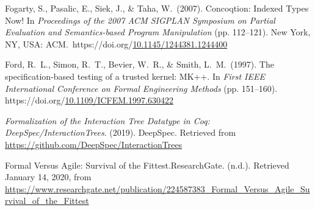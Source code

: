 \documentclass[12pt,twoside]{article}
\begin{document}
{\begin{thebibliography}{1079}
\mdbibitemlabel{}Fogarty, S., Pasalic, E., Siek, J., \& Taha, W.~(2007). Concoqtion: Indexed Types Now! In \emph{Proceedings of the 2007 ACM SIGPLAN Symposium on Partial Evaluation and Semantics-based Program Manipulation} (pp. 112–121). New York, NY, USA: ACM.~https://doi.org/\href{https://dx.doi.org/10.1145/1244381.1244400}{10.1145/1244381.1244400}%

\mdbibitemlabel{}Ford, R.~L., Simon, R.~T., Bevier, W.~R., \& Smith, L.~M.~(1997). The specification-based testing of a trusted kernel: MK++. In \emph{First IEEE International Conference on Formal Engineering Methods} (pp. 151–160). https://doi.org/\href{https://dx.doi.org/10.1109/ICFEM.1997.630422}{10.1109/ICFEM.1997.630422}%

\mdbibitemlabel{}\emph{Formalization of the Interaction Tree Datatype in Coq: DeepSpec/InteractionTrees}. (2019). DeepSpec. Retrieved from \href{https://github.com/DeepSpec/InteractionTrees}{{\ttfamily https://\hspace{0pt}github.\hspace{0pt}com/\hspace{0pt}DeepSpec/\hspace{0pt}InteractionTrees}}%

\mdbibitemlabel{}Formal Versus Agile: Survival of the Fittest.ResearchGate. (n.d.). Retrieved January 14, 2020, from \href{https://www.researchgate.net/publication/224587383_Formal_Versus_Agile_Survival_of_the_Fittest}{{\ttfamily https://\hspace{0pt}www.\hspace{0pt}researchgate.\hspace{0pt}net/\hspace{0pt}publication/\hspace{0pt}224587383\_\hspace{0pt}Formal\_\hspace{0pt}Versus\_\hspace{0pt}Agile\_\hspace{0pt}Survival\_\hspace{0pt}of\_\hspace{0pt}the\_\hspace{0pt}Fittest}}%


\end{thebibliography}}
\end{document}
